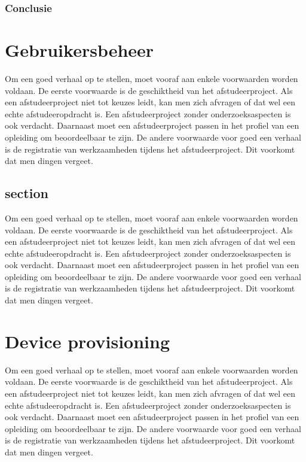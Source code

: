 		
		
		
		
		\subsection{Conclusie}
		
		\chapter{Gebruikersbeheer}
		
		Om een goed verhaal op te stellen, moet vooraf aan enkele voorwaarden
		worden voldaan. De eerste voorwaarde is de geschiktheid van het
		afstudeerproject. Als een afstudeerproject niet tot keuzes leidt, kan
		men zich afvragen of dat wel een echte afstudeeropdracht is. Een
		afstudeerproject zonder onderzoeksaspecten is ook verdacht. Daarnaast
		moet een afstudeerproject passen in het profiel van een opleiding om
		beoordeelbaar te zijn. De andere voorwaarde voor goed een verhaal is
		de registratie van werkzaamheden tijdens het afstudeerproject. Dit
		voorkomt dat men dingen vergeet.
		\section{section}
		
		Om een goed verhaal op te stellen, moet vooraf aan enkele voorwaarden
		worden voldaan. De eerste voorwaarde is de geschiktheid van het
		afstudeerproject. Als een afstudeerproject niet tot keuzes leidt, kan
		men zich afvragen of dat wel een echte afstudeeropdracht is. Een
		afstudeerproject zonder onderzoeksaspecten is ook verdacht. Daarnaast
		moet een afstudeerproject passen in het profiel van een opleiding om
		beoordeelbaar te zijn. De andere voorwaarde voor goed een verhaal is
		de registratie van werkzaamheden tijdens het afstudeerproject. Dit
		voorkomt dat men dingen vergeet.
		
		\chapter{Device provisioning}
		
		Om een goed verhaal op te stellen, moet vooraf aan enkele voorwaarden
		worden voldaan. De eerste voorwaarde is de geschiktheid van het
		afstudeerproject. Als een afstudeerproject niet tot keuzes leidt, kan
		men zich afvragen of dat wel een echte afstudeeropdracht is. Een
		afstudeerproject zonder onderzoeksaspecten is ook verdacht. Daarnaast
		moet een afstudeerproject passen in het profiel van een opleiding om
		beoordeelbaar te zijn. De andere voorwaarde voor goed een verhaal is
		de registratie van werkzaamheden tijdens het afstudeerproject. Dit
		voorkomt dat men dingen vergeet.
